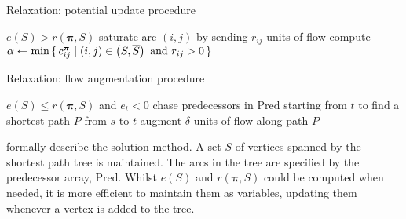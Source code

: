 \begin{algorithm}
    \caption{Relaxation: potential update procedure}
    \label{algo:relaxation-update-potentials}
    \begin{algorithmic}[1]
        \Require $e(S) > r(\boldsymbol{\pi},S)$
        \Statex
         \label{algo:relaxation-update-potentials:saturate-loop}
        \State saturate arc $(i,j)$ by sending $r_{ij}$ units of flow \label{algo:relaxation-update-potentials:saturate-cmd}
        \EndFor
        \State compute $\alpha \gets \min\set{c_{ij}^{\boldsymbol{\pi}} | (i,j)\in\left(S,\overline{S}\right)\mbox{ and }r_{ij}>0}$
        \label{algo:relaxation-update-potentials:compute-alpha}
        \label{algo:relaxation-update-potentials:update-loop}
        \label{algo:relaxation-update-potentials:update-cmd}
        \EndFor
        \EndFunction
    \end{algorithmic}
\end{algorithm}

\begin{algorithm}
    \caption{Relaxation: flow augmentation procedure}
    \label{algo:relaxation-augment-flow}
    \begin{algorithmic}[1]
        \Require $e(S) \leq r(\boldsymbol{\pi},S)$ and $e_t < 0$
        \Statex
        \State chase predecessors in $\mathrm{Pred}$ starting from $t$ to find a shortest path $P$ from $s$ to $t$ \label{algo:relaxation-augment-flow:find-P}
         \label{algo:relaxation-augment-flow:compute-delta}
        \State augment $\delta$ units of flow along path $P$ \label{algo:relaxation-augment-flow:augment-path}
        \EndFunction
    \end{algorithmic}
\end{algorithm}

 formally describe the solution method. A set $S$ of vertices spanned by the shortest path tree is maintained. The arcs in the tree are specified by the predecessor array, $\mathrm{Pred}$. Whilst $e(S)$ and $r(\boldsymbol{\pi},S)$ could be computed when needed, it is more efficient to maintain them as variables, updating them whenever a vertex is added to the tree.

